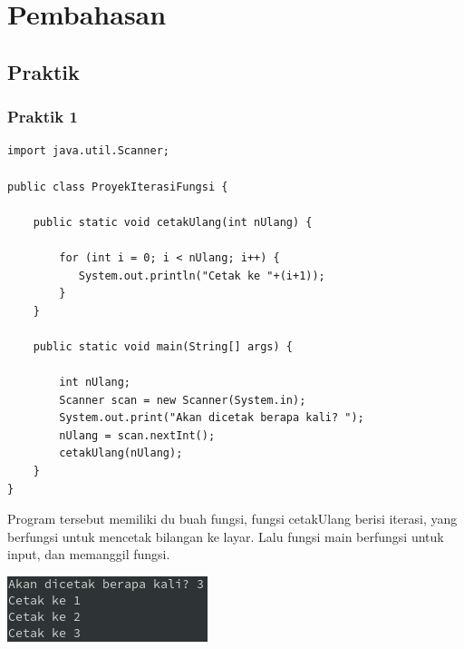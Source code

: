 \documentclass[a4paper,12pt]{article}
\begin{document}
\section{Pembahasan}
\subsection{Praktik}
\subsubsection{Praktik 1}
\begin{lstlisting}
import java.util.Scanner;

public class ProyekIterasiFungsi {

    public static void cetakUlang(int nUlang) {
       
        for (int i = 0; i < nUlang; i++) {
           System.out.println("Cetak ke "+(i+1)); 
        }
    }

    public static void main(String[] args) {

        int nUlang;
        Scanner scan = new Scanner(System.in);
        System.out.print("Akan dicetak berapa kali? ");
        nUlang = scan.nextInt();
        cetakUlang(nUlang);
    }
}
\end{lstlisting}

Program tersebut memiliki du buah fungsi, fungsi cetakUlang berisi iterasi, yang berfungsi untuk mencetak bilangan ke
layar. Lalu fungsi main berfungsi untuk input, dan memanggil fungsi.

\begin{center}
    \includegraphics[scale=1]{1.png} 
\end{center}
\end{document}
